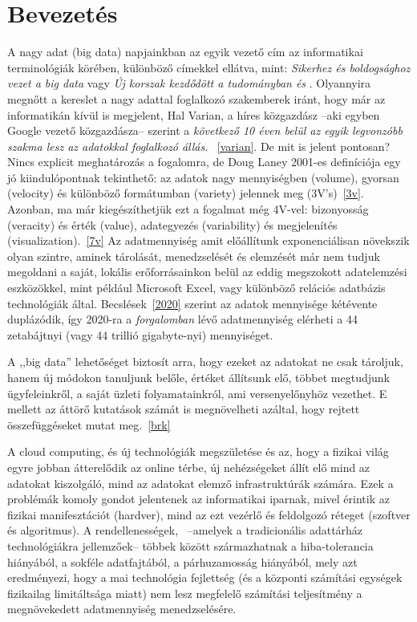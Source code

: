 \documentclass[a4paper,12pt]{article}
\author{Belényesi Roland}
\begin{document}
\section{Bevezetés}
A nagy adat (big data) napjainkban az egyik vezető cím az informatikai terminológiák körében, különböző címekkel ellátva, mint: 
\textsl{Sikerhez és boldogsághoz vezet a big data} \cite{ori} vagy 
\textsl{Új korszak kezdődött a tudományban és} \cite{oria}. Olyannyira megnőtt a kereslet a nagy adattal foglalkozó szakemberek iránt, hogy már az informatikán kívül is megjelent, Hal Varian, a híres közgazdász --aki egyben Google vezető közgazdásza-- szerint a \textsl{következő 10 éven belül az egyik legvonzóbb szakma lesz az adatokkal foglalkozó állás}. ~\ref{varian}. De mit is jelent pontosan? Nincs explicit meghatározás a fogalomra, de Doug Laney 2001-es definíciója egy jó kiindulópontnak tekinthető: az adatok nagy mennyiségben (volume), gyorsan (velocity) és különböző formátumban (variety) jelennek meg (3V's)~\ref{3v}. Azonban, ma már kiegészíthetjük ezt a fogalmat még 4V-vel: bizonyosság (veracity) és érték (value), adategyezés (variability) és megjelenítés (visualization).~\ref{7v} Az adatmennyiség amit előállítunk exponenciálisan növekszik olyan szintre, aminek tárolását, menedzselését és elemzését már nem tudjuk megoldani a saját, lokális erőforrásainkon belül az eddig megszokott adatelemzési eszközökkel, mint például Microsoft Excel, vagy különböző relációs adatbázis technológiák által.
Becslések~\ref{2020} szerint az adatok mennyisége kétévente duplázódik, így 2020-ra a \textsl{forgalomban} lévő adatmennyiség elérheti a 44 zetabájtnyi (vagy 44 trillió gigabyte-nyi) mennyiséget.
\linebreak

A ,,big data'' lehetőséget biztosít arra, hogy ezeket az adatokat ne csak tároljuk, hanem új módokon tanuljunk belőle, értéket állítsunk elő, többet megtudjunk ügyfeleinkről, a saját üzleti folyamatainkról, ami versenyelőnyhöz vezethet. E mellett az áttörő kutatások számát is megnövelheti azáltal, hogy rejtett összefüggéseket mutat meg.~\ref{brk} 

A cloud computing, és új technológiák megszületése és az, hogy a fizikai világ egyre jobban átterelődik az online térbe, új nehézségeket állít elő mind az adatokat kiszolgáló, mind az adatokat elemző infrastruktúrák számára. Ezek a problémák komoly gondot jelentenek az informatikai iparnak, mivel érintik az fizikai manifesztációt (hardver), mind az ezt vezérlő és feldolgozó réteget (szoftver és algoritmus). A rendellenességek,~\cite{dst} --amelyek a tradicionális adattárház technológiákra jellemzőek-- többek között származhatnak a hiba-tolerancia hiányából, a sokféle adatfajtából, a párhuzamosság hiányából, mely azt eredményezi, hogy a mai technológia fejlettség (és a központi számítási egységek fizikailag limitáltsága miatt) nem lesz megfelelő számítási teljesítmény a megnövekedett adatmennyiség menedzselésére.
\end{document}
